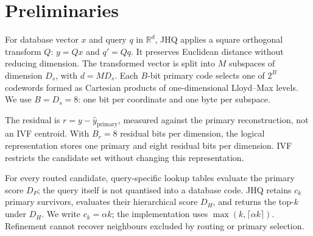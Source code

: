 \section{Preliminaries}
\label{sec:preli}
For database vector $x$ and query $q$ in $\mathbb{R}^d$, JHQ applies a square
orthogonal transform $Q$: $y=Qx$ and $q'=Qq$. It preserves Euclidean distance
without reducing dimension. The transformed vector is split into $M$ subspaces
of dimension $D_s$, with $d=MD_s$. Each $B$-bit primary code selects one of
$2^B$ codewords formed as Cartesian products of one-dimensional Lloyd--Max
levels. We use $B=D_s=8$: one bit per coordinate and one byte per subspace.

The residual is $r=y-\hat{y}_{\mathrm{primary}}$, measured against the primary
reconstruction, not an IVF centroid. With $B_r=8$ residual bits per dimension,
the logical representation stores one primary and eight residual bits per
dimension. IVF restricts the candidate set without changing this representation.

For every routed candidate, query-specific lookup tables evaluate the primary
score $D_P$; the query itself is not quantised into a database code. JHQ retains
$c_k$ primary survivors, evaluates their hierarchical score $D_H$, and returns
the top-$k$ under $D_H$. We write $c_k=\alpha k$; the implementation uses
$\max(k,\lceil\alpha k\rceil)$. Refinement cannot recover neighbours excluded
by routing or primary selection.
